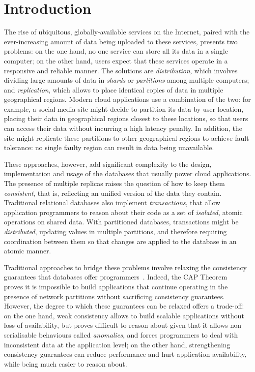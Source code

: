 \cleardoublepage
\chapter{Introduction}
\label{chapter:introduction}

The rise of ubiquitous, globally-available services on the Internet, paired with the ever-increasing amount of data being uploaded to these services, presents two problems: on the one hand, no one service can store all its data in a single computer; on the other hand, users expect that these services operate in a responsive and reliable manner. The solutions are \emph{distribution}, which involves dividing large amounts of data in \emph{shards} or \emph{partitions} among multiple computers; and \emph{replication}, which allows to place identical copies of data in multiple geographical regions. Modern cloud applications use a combination of the two: for example, a social media site might decide to partition its data by user location, placing their data in geographical regions closest to these locations, so that users can access their data without incurring a high latency penalty. In addition, the site might replicate these partitions to other geographical regions to achieve fault-tolerance: no single faulty region can result in data being unavailable.

These approaches, however, add significant complexity to the design, implementation and usage of the databases that usually power cloud applications. The presence of multiple replicas raises the question of how to keep them \emph{consistent}, that is, reflecting an unified version of the data they contain. Traditional relational databases also implement \emph{transactions}, that allow application programmers to reason about their code as a set of \emph{isolated}, atomic operations on shared data. With partitioned databases, transactions might be \emph{distributed}, updating values in multiple partitions, and therefore requiring coordination between them so that changes are applied to the database in an atomic manner.

Traditional approaches to bridge these problems involve relaxing the consistency guarantees that databases offer programmers~\citep{vogels-eventual}. Indeed, the CAP Theorem~\citep{cap-brewer, cap-theorem} proves it is impossible to build applications that continue operating in the presence of network partitions without sacrificing consistency guarantees. However, the degree to which these guarantees can be relaxed offers a trade-off: on the one hand, weak consistency allows to build scalable applications without loss of availability, but proves difficult to reason about given that it allows non-serialisable behaviours called \emph{anomalies}, and forces programmers to deal with inconsistent data at the application level; on the other hand, strengthening consistency guarantees can reduce performance and hurt application availability, while being much easier to reason about.

